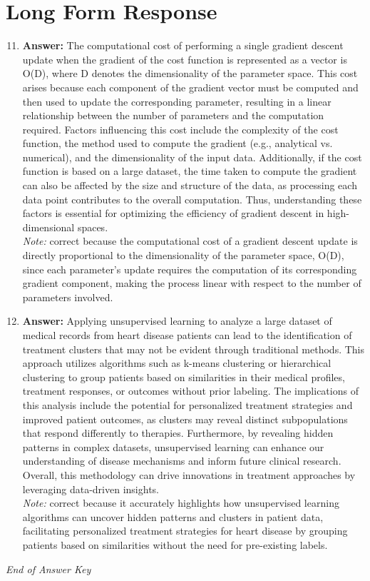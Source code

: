 \documentclass[12pt]{article}
\begin{document}
\section*{Long Form Response}
\begin{enumerate}[label=\arabic*.]
\setcounter{enumi}{10}
\item \textbf{Answer:} The computational cost of performing a single gradient descent update when the gradient of the cost function is represented as a vector is O(D), where D denotes the dimensionality of the parameter space. This cost arises because each component of the gradient vector must be computed and then used to update the corresponding parameter, resulting in a linear relationship between the number of parameters and the computation required. Factors influencing this cost include the complexity of the cost function, the method used to compute the gradient (e.g., analytical vs. numerical), and the dimensionality of the input data. Additionally, if the cost function is based on a large dataset, the time taken to compute the gradient can also be affected by the size and structure of the data, as processing each data point contributes to the overall computation. Thus, understanding these factors is essential for optimizing the efficiency of gradient descent in high- dimensional spaces.
\\ \textit{Note:} correct because the computational cost of a gradient descent update is directly proportional to the dimensionality of the parameter space, O(D), since each parameter's update requires the computation of its corresponding gradient component, making the process linear with respect to the number of parameters involved.
\item \textbf{Answer:} Applying unsupervised learning to analyze a large dataset of medical records from heart disease patients can lead to the identification of treatment clusters that may not be evident through traditional methods. This approach utilizes algorithms such as k-means clustering or hierarchical clustering to group patients based on similarities in their medical profiles, treatment responses, or outcomes without prior labeling. The implications of this analysis include the potential for personalized treatment strategies and improved patient outcomes, as clusters may reveal distinct subpopulations that respond differently to therapies. Furthermore, by revealing hidden patterns in complex datasets, unsupervised learning can enhance our understanding of disease mechanisms and inform future clinical research. Overall, this methodology can drive innovations in treatment approaches by leveraging data-driven insights.
\\ \textit{Note:} correct because it accurately highlights how unsupervised learning algorithms can uncover hidden patterns and clusters in patient data, facilitating personalized treatment strategies for heart disease by grouping patients based on similarities without the need for pre-existing labels.
\end{enumerate}

\vfill
\noindent\textit{End of Answer Key}
\end{document}
